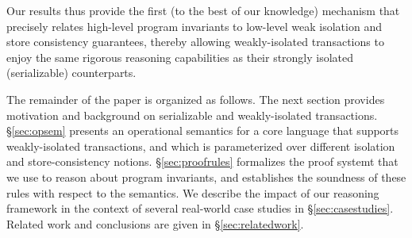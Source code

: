 \noindent Our results thus provide the first (to the best of our knowledge)
mechanism that precisely relates high-level program invariants to
low-level weak isolation and store consistency guarantees, thereby
allowing weakly-isolated transactions to enjoy the same rigorous
reasoning capabilities as their strongly isolated (serializable)
counterparts.

The remainder of the paper is organized as follows.  The next section
provides motivation and background on serializable and weakly-isolated
transactions. \S\ref{sec:opsem} presents an operational semantics for
a core language that supports weakly-isolated transactions, and which
is parameterized over different isolation and store-consistency
notions. \S\ref{sec:proofrules} formalizes the proof systemt that we
use to reason about program invariants, and establishes the soundness
of these rules with respect to the semantics.  We describe the impact
of our reasoning framework in the context of several real-world case
studies in \S\ref{sec:casestudies}.  Related work and conclusions are
given in \S\ref{sec:relatedwork}.
